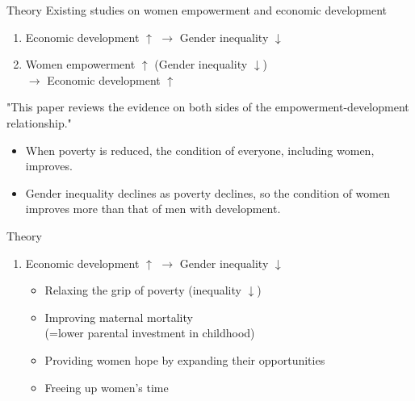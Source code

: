 \documentclass[xcolor=dvipsnames, t]{beamer}
\begin{document}
	\begin{frame}[fragile]{Theory}
		Existing studies on women empowerment and economic development \pause
		\begin{enumerate}
			\item Economic development $\uparrow$ $\rightarrow$ Gender inequality $\downarrow$ \pause
			\item Women empowerment $\uparrow$ (Gender inequality $\downarrow$)\\$\rightarrow$ Economic development $\uparrow$ \pause
		\end{enumerate}
		"This paper reviews the evidence on both sides of the empowerment-development relationship." \citep[1053]{duflo:2012} \pause
		\begin{itemize}
			\item When poverty is reduced, the condition of everyone, including women, improves. \pause
			\item Gender inequality declines as poverty declines, so the condition
			of women improves more than that of men with development.
		\end{itemize}
	\end{frame}
	
	\begin{frame}[fragile]{Theory}
		\begin{enumerate}
			\item Economic development $\uparrow$ $\rightarrow$ Gender inequality $\downarrow$  \pause
			\begin{itemize}
				\item Relaxing the grip of poverty (inequality $\downarrow$)
				\item Improving maternal mortality\\(=lower parental investment in childhood)
				\item Providing women hope by expanding their opportunities
				\item Freeing up women's time
			\end{itemize}
		\end{enumerate}
	\end{frame}
	
\end{document}
